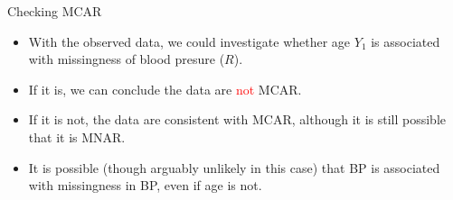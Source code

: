 \documentclass[ignorenonframetext,]{beamer}
\providecommand{\tightlist}{%
  \setlength{\itemsep}{0pt}\setlength{\parskip}{0pt}}
\begin{document}
\begin{frame}{Checking MCAR}
\protect\hypertarget{checking-mcar}{}

\begin{itemize}
\tightlist
\item
  With the observed data, we could investigate whether age \(Y_{1}\) is
  associated with missingness of blood presure (\(R\)).
\item
  If it is, we can conclude the data are \textcolor{red}{not} MCAR.
\item
  If it is not, the data are consistent with MCAR, although it is still
  possible that it is MNAR.
\item
  It is possible (though arguably unlikely in this case) that BP is
  associated with missingness in BP, even if age is not.
\end{itemize}

\end{frame}
\end{document}
